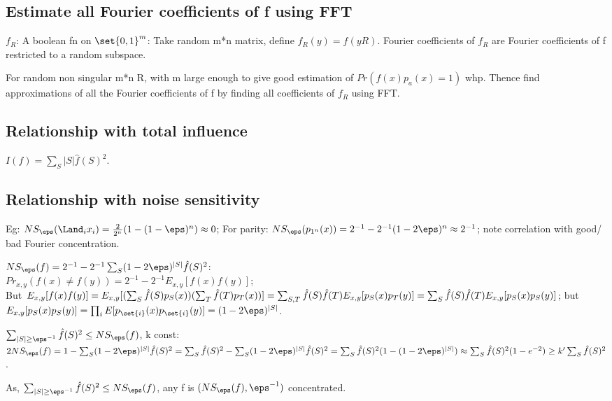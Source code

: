 \documentclass[oneside, article]{memoir}
\begin{document}
\subsection{Estimate all Fourier coefficients of f using FFT}
$f_R$: A boolean fn on $\set{0,1}^m$: Take random m*n matrix, define $f_R(y) = f(yR)$. Fourier coefficients of $f_R$ are Fourier coefficients of f restricted to a random subspace.

For random non singular m*n R, with m large enough to give good estimation of $Pr(f(x) p_a(x) = 1)$ whp. Thence find approximations of all the Fourier coefficients of f by finding all coefficients of $f_R$ using FFT.

\subsection{Relationship with total influence}
$I(f) = \sum_{S}|S|\hat{f}(S)^{2}$. \why

\subsection{Relationship with noise sensitivity}
Eg: $NS_{\eps}(\Land_{i} x_{i}) = \frac{2}{2^{n}}(1-(1-\eps)^{n}) \approx 0$; For parity: $NS_{\eps}(p_{1^{n}}(x)) = 2^{-1}-2^{-1}(1-2 \eps)^{n} \approx 2^{-1}$; note correlation with good/ bad Fourier concentration.

$NS_{\eps}(f) = 2^{-1}-2^{-1} \sum_{S}(1-2\eps)^{|S|}\hat{f}(S)^{2}$:\\
$Pr_{x,y}(f(x) \neq f(y)) = 2^{-1} - 2^{-1}E_{x,y}[f(x)f(y)]$; \\
But $E_{x,y}[f(x)f(y)] = E_{x,y}[(\sum_{S}\hat{f}(S)p_{S}(x)) (\sum_{T}\hat{f}(T)p_{T}(x))] \\
= \sum_{S, T}\hat{f}(S)\hat{f}(T)E_{x,y}[p_{S}(x)p_{T}(y)] = \sum_{S}\hat{f}(S)\hat{f}(T)E_{x,y}[p_{S}(x)p_{S}(y)]$; but\\
 $E_{x,y}[p_{S}(x)p_{S}(y)] = \prod_{i} E[p_{\set{i}}(x)p_{\set{i}}(y)] = (1-2\eps)^{|S|}$.

$\sum_{|S| \geq \eps^{-1}} \hat{f}(S)^{2} \leq NS_{\eps}(f)$, k const: $2NS_{\eps}(f) = 1 - \sum_{S}(1-2\eps)^{|S|}\hat{f}(S)^{2} = \sum_{S} \hat{f}(S)^{2}-\sum_{S}(1-2\eps)^{|S|}\hat{f}(S)^{2} = \sum_{S} \hat{f}(S)^{2}(1-(1-2\eps)^{|S|}) \approx \sum_{S} \hat{f}(S)^{2}(1-e^{-2}) \geq k' \sum_{S} \hat{f}(S)^{2}$.

As, $\sum_{|S| \geq \eps^{-1}} \hat{f}(S)^{2} \leq NS_{\eps}(f)$, any f is $(NS_{\eps}(f), \eps^{-1})$ concentrated.
\end{document}

